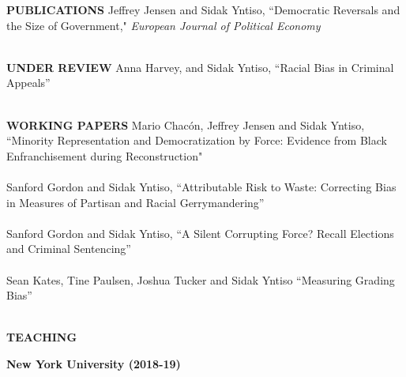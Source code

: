 \documentclass[letterpaper,11pt,oneside]{article}
\begin{document}
\noindent\textbf{\textsc{PUBLICATIONS}
\vspace{2mm}}
\newline
\noindent
\hangindent=0.7cm {
	 Jeffrey Jensen and Sidak Yntiso,  ``Democratic Reversals and the Size of Government,"  \textit{European Journal of Political Economy} \\ \\
}

\noindent\textbf{\textsc{UNDER REVIEW}
	\vspace{2mm}}
\newline
\noindent
\hangindent=0.7cm {
	Anna Harvey, and Sidak Yntiso, {``Racial Bias in Criminal Appeals''} \\ \\
}


\noindent\textbf{\textsc{WORKING PAPERS}
\vspace{2mm}}
\newline
\noindent
\hangindent=0.7cm {
	Mario Chac\'{o}n, Jeffrey Jensen and Sidak Yntiso, {``Minority Representation and Democratization by Force: Evidence from Black Enfranchisement during Reconstruction"} \\ \\
	Sanford Gordon and Sidak Yntiso, {``Attributable Risk to Waste: Correcting Bias in Measures of Partisan and Racial Gerrymandering''} \\ \\	
	Sanford Gordon and Sidak Yntiso, {``A Silent Corrupting Force? Recall Elections and Criminal Sentencing''} \\ \\	
	Sean Kates, Tine Paulsen, Joshua Tucker and Sidak Yntiso ``Measuring Grading Bias'' \\ \\	
}


\bigskip
\noindent\textbf{\textsc{TEACHING}
\vspace{-2mm}}
\newline
\noindent

\textbf{New York University (2018-19)}\\
\noindent
{}
\end{document}
